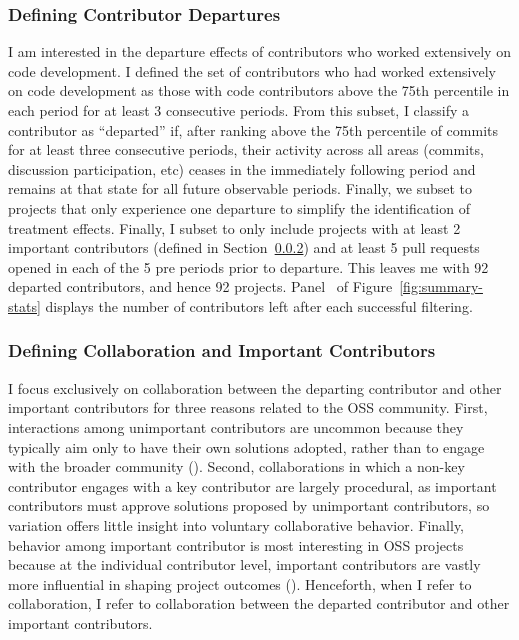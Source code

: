 \documentclass[12pt,notitlepage]{article}
\begin{document}
\subsubsection{Defining Contributor Departures}
I am interested in the departure effects of contributors who worked extensively on code development. I defined the set of contributors who had worked extensively on code development as those with code contributors above the 75th percentile in each period for at least 3 consecutive periods. From this subset, I classify a contributor as “departed” if, after ranking above the 75th percentile of commits for at least three consecutive periods, their activity across all areas (commits, discussion participation, etc) ceases in the immediately following period and remains at that state for all future observable periods. Finally, we subset to projects that only experience one departure to simplify the identification of treatment effects. Finally, I subset to only include projects with at least 2 important contributors (defined in Section~\ref{sec:collab_imp_contr}) and at least 5 pull requests opened in each of the 5 pre periods prior to departure. This leaves me with 92 departed contributors, and hence 92 projects. Panel~ of Figure~\ref{fig:summary-stats} displays the number of contributors left after each successful filtering. 


\subsubsection{Defining Collaboration and Important Contributors} \label{sec:collab_imp_contr}

I focus exclusively on collaboration between the departing contributor and other important contributors for three reasons related to the OSS community. First, interactions among unimportant contributors are uncommon because they typically aim only to have their own solutions adopted, rather than to engage with the broader community (\cite{hippel_open_2003}). Second, collaborations in which a non-key contributor engages with a key contributor are largely procedural, as important contributors must approve solutions proposed by unimportant contributors, so variation offers little insight into voluntary collaborative behavior. Finally, behavior among important contributor is most interesting in OSS projects because at the individual contributor level, important contributors are vastly more influential in shaping project outcomes (\cite{crowston_core_2006}). Henceforth, when I refer to collaboration, I refer to collaboration between the departed contributor and other important contributors. 
\end{document}
